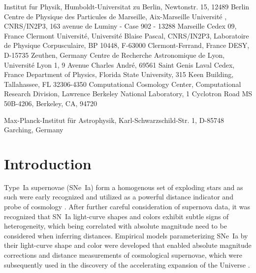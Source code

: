\documentclass{aastex}   	%
\begin{document}
{
    Institut fur Physik,  Humboldt-Universitat zu Berlin,
    Newtonstr. 15, 12489 Berlin
}
{
    Centre de Physique des Particules de Marseille, 
    Aix-Marseille Universit\'e , CNRS/IN2P3, 
    163 avenue de Luminy - Case 902 - 13288 Marseille Cedex 09, France
}
{
    Clermont Universit\'e, Universit\'e Blaise Pascal, CNRS/IN2P3, Laboratoire de Physique Corpusculaire,
    BP 10448, F-63000 Clermont-Ferrand, France
}
{
    DESY, D-15735 Zeuthen, Germany
}
{
    Centre de Recherche Astronomique de Lyon, Universit\'e Lyon 1,
    9 Avenue Charles Andr\'e, 69561 Saint Genis Laval Cedex, France
}
{
    Department of Physics, Florida State University,
    315 Keen Building, Tallahassee, FL 32306-4350
}
{
    Computational Cosmology Center, Computational Research Division, Lawrence Berkeley National Laboratory, 
    1 Cyclotron Road MS 50B-4206, Berkeley, CA, 94720
}

{
    Max-Planck-Institut f\"ur Astrophysik, Karl-Schwarzschild-Str. 1,
D-85748 Garching, Germany
}

\begin{abstract}
An empirical model for SN~Ia peak magnitudes with two color parameters and dependence on the equivalent widths of CaII, SiII, and SiII velocity
is applied to the supernova sample of the Nearby Supernova Factory.  The peak magnitudes and their colors are found to be 
dependent on the spectral equivalent widths, and two independent color parameters with better than 0.999 confidence.
One parameter, interpreted as due to extrinsic host-galaxy
dust extinction, is consistent with an $R_V=2.5$  \citet{1999PASP..111...63F} dust model.  The second parameter is inconsistent with dust and
is inferred to have origins intrinsic to supernovae.  Our model explains features of external data: the wide range and
the low values of inferred $R_V$ among
SNe~Ia, and the colors of SN~2014J.
\end{abstract}


\section{Introduction}
Type~Ia supernovae (SNe~Ia) form a homogenous set of exploding stars and as such were early recognized and utilized as a powerful distance indicator 
and probe of cosmology \citep[e.g.][]{1992ARA&A..30..359B, 1993ApJ...415....1S}.  After further careful consideration of supernova data, it was recognized
that SN~Ia light-curve shapes \citep{1993ApJ...413L.105P} and colors \citep{1998A&A...331..815T} exhibit subtle signs of heterogeneity,
which being correlated with absolute magnitude
need to be considered when inferring distances.  Empirical models parameterizing SNe~Ia by their light-curve shape
and color were developed \citep{1996ApJ...473...88R, 1999ApJ...517..565P} that enabled absolute magnitude corrections
and distance measurements of cosmological supernovae,
which 
were subsequently used in the discovery of the accelerating expansion of the Universe \citep{1998AJ....116.1009R,1999ApJ...517..565P}.
\end{document}
